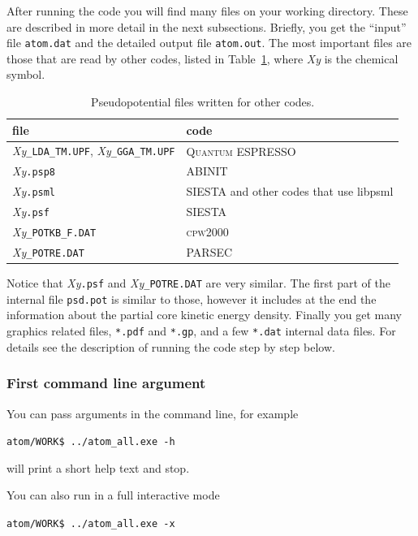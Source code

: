 \documentclass[11pt]{article}
\begin{document}
After running the code you will find many files on your working directory.
These are described in more detail in the next subsections.
Briefly, you get the ``input'' file \texttt{atom.dat} and the detailed output file
\texttt{atom.out}.  The most important files are those that are read by other codes,
listed in Table~\ref{tab:outfiles}, where \textit{Xy} is the chemical symbol.


\begin{table}[htb]
\centering
\caption{Pseudopotential files written for other codes.}
\label{tab:outfiles}
\begin{tabular}{ll}
\hline
file & code \\
\hline
\textit{Xy}\texttt{\_LDA\_TM.UPF}, \textit{Xy}\texttt{\_GGA\_TM.UPF} & \textsc{Quantum ESPRESSO} \\
\textit{Xy}\texttt{.psp8} & \textsc{ABINIT} \\
\textit{Xy}\texttt{.psml} & \textsc{SIESTA} and other codes that use libpsml \\
\textit{Xy}\texttt{.psf}  & \textsc{SIESTA} \\
\textit{Xy}\texttt{\_POTKB\_F.DAT} & \textsc{cpw2000} \\
\textit{Xy}\texttt{\_POTRE.DAT} & \textsc{PARSEC} \\
\hline
\end{tabular}
\end{table}

Notice that \textit{Xy}\texttt{.psf} and \textit{Xy}\texttt{\_POTRE.DAT} are very similar.
The first part of the internal file \texttt{psd.pot} is similar to those, however it includes at the end the information
about the partial core kinetic energy density.
Finally you get many graphics related files, \texttt{*.pdf} and \texttt{*.gp},
and a few \texttt{*.dat} internal data files.
For details see the description of running the code step by step below.

\subsubsection{First command line argument}

You can pass arguments in the command line, for example

\noindent\texttt{atom/WORK\$ ../atom{\_}all.exe -h}

\noindent
will print a short help text and stop.

You can also run in a full interactive mode

\noindent\texttt{atom/WORK\$ ../atom{\_}all.exe -x}
\end{document}
